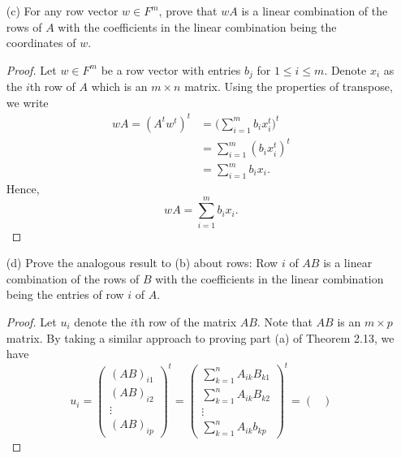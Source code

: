 \begin{enumerate}
\begin{proof}
        \[  {u}_{j} = \sum_{ i=1  }^{ n } {B}_{ij} {x}_{i} \ \text{ for } 1 \leq j \leq p. \]
        \end{proof}
    \item[(c)] For any row vector \( w \in F^{m} \), prove that \( wA  \) is a linear combination of the rows of \( A  \) with the coefficients in the linear combination being the coordinates of \( w  \).
        \begin{proof}
        Let \( w \in F^{m} \) be a row vector with entries \( {b}_{j}  \) for \(  1 \leq i \leq m  \). Denote \( {x}_{i}  \) as the \( i \)th row of \( A  \) which is an \(  m \times n  \) matrix. Using the properties of transpose, we write
        \begin{align*}
            wA = (A^{t} w^{t})^{t} &= \Big( \sum_{ i=1 }^{ m } {b}_{i} {x}^{t}_{i}  \Big)^{t} \\
                                   &= \sum_{ i=1  }^{ m } ({b}_{i} {x}^{t}_{i})^{t} \\
                                   &= \sum_{ i=1  }^{ m } {b}_{i} {x}_{i}.
        \end{align*}
        Hence, 
        \[  wA = \sum_{ i=1  }^{ m } {b}_{i} {x}_{i}. \]
        \end{proof}
    \item[(d)] Prove the analogous result to (b) about rows: Row \( i \) of \( AB  \) is a linear combination of the rows of \( B  \) with the coefficients in the linear combination being the entries of row \( i  \) of \( A  \).
        \begin{proof}
        Let \( {u}_{i}  \) denote the \( i \)th row of the matrix \( AB  \). Note that \( AB  \) is an \( m \times p  \) matrix. By taking a similar approach to proving part (a) of Theorem 2.13, we have 
        \[  {u}_{i} = \begin{pmatrix}
            {(AB)}_{i1} \\
            {(AB)}_{i2} \\
            \vdots \\
            {(AB)}_{ip}
        \end{pmatrix}^{t} = \begin{pmatrix}
            \sum_{ k=1 }^{ n } {A}_{ik } {B}_{k1} \\
            \sum_{ k=1  }^{ n } {A}_{ik } {B}_{k2 } \\
            \vdots \\
            \sum_{ k=1  }^{ n } {A}_{ik } {b}_{k p}
        \end{pmatrix}^{t} = \begin{pmatrix}

\end{pmatrix}\]
\end{proof}
\end{enumerate}
